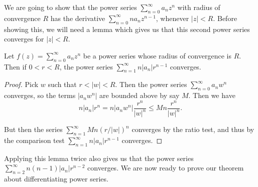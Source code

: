 \documentclass[a4paper]{scrartcl}
\begin{document}
We are going to show that the power series $\sum_{n = 0}^{\infty} a_n z^n$ with radius of convergence $R$ has the derivative $\sum_{n = 0}^{\infty} n a_n z^{n - 1}$, whenever $|z| < R$.
Before showing this, we will need a lemma which gives us that this second power series converges for $|z| < R$.


\begin{lemma}
	Let $f(z) = \sum_{n = 0}^{\infty} a_n z^n$ be a power series whose radius of convergence is $R$. 
	Then if $0 < r < R$, the power series $\sum_{n = 1}^{\infty} n |a_n|r^{n - 1}$ converges.
\end{lemma}
\begin{proof}
	Pick $w$ such that $r < |w| < R$. Then the power series $\sum_{n = 0}^{\infty} a_n w^n$ converges, so the terms $|a_n w^n|$ are bounded above by say $M$. Then we have
	$$
	n|a_n|r^n = n|a_n w^n| \frac{r^n}{|w|^n} \leq M n \frac{r^n}{|w|^n}.
	$$

	But then the series $\sum_{n = 1}^{\infty} Mn (r/|w|)^n$ converges by the ratio test, and thus by the comparison test $\sum_{n = 1}^{\infty} n |a_n| r^{n - 1}$ converges.
\end{proof}

Applying this lemma twice also gives us that the power series
$
\sum_{n = 2}^{\infty} n(n - 1) |a_n| r^{n - 2}
$
converges. We are now ready to prove our theorem about differentiating power series.
\end{document}
